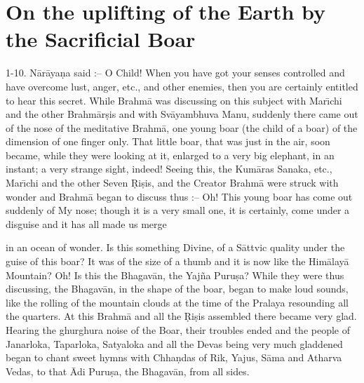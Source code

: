 \chapter{On the uplifting of the Earth by the Sacrificial Boar}

1-10. N\=ar\=aya\d{n}a said :-- O Child! When you have got your senses controlled and have overcome lust, anger, etc., and other enemies, then you are certainly entitled to hear this secret. While Brahm\=a was discussing on this subject with Mar\={\i}chi and the other Brahm\=ar\d{s}is and with Sv\=ayambhuva Manu, suddenly there came out of the nose of the meditative Brahm\=a, one young boar (the child of a boar) of the dimension of one finger only. That little boar, that was just in the air, soon became, while they were looking at it, enlarged to a very big elephant, in an instant; a very strange sight, indeed! Seeing this, the Kum\=aras Sanaka, etc., Mar\={\i}chi and the other Seven \d{R}i\d{s}is, and the Creator Brahm\=a were struck with wonder and Brahm\=a began to discuss thus :-- Oh! This young boar has come out suddenly of My nose; though it is a very small one, it is certainly, come under a disguise and it has all made us merge

in an ocean of wonder. Is this something Divine, of a S\=attvic quality under the guise of this boar? It was of the size of a thumb and it is now like the Him\=alay\=a Mountain? Oh! Is this the Bhagav\=an, the Yaj\~na Puru\d{s}a? While they were thus discussing, the Bhagav\=an, in the shape of the boar, began to make loud sounds, like the rolling of the mountain clouds at the time of the Pralaya resounding all the quarters. At this Brahm\=a and all the \d{R}i\d{s}is assembled there became very glad. Hearing the ghurghura noise of the Boar, their troubles ended and the people of Janarloka, Taparloka, Satyaloka and all the Devas being very much gladdened began to chant sweet hymns with Chha\d{n}das of Rik, Yajus, S\=ama and Atharva Vedas, to that \=Adi Puru\d{s}a, the Bhagav\=an, from all sides.

